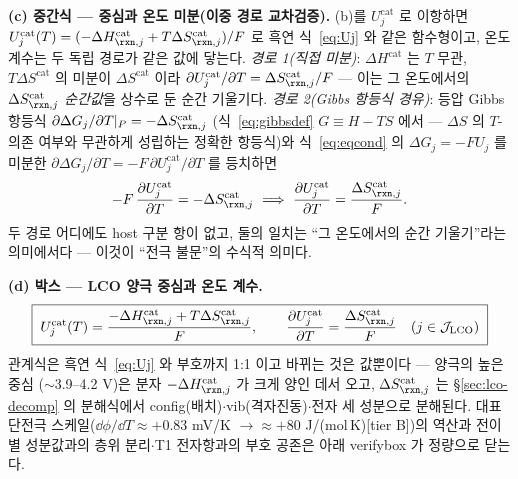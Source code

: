 \textbf{(c) 중간식 --- 중심과 온도 미분(이중 경로 교차검증).}
(b)를 $U_j^\mathrm{cat}$ 로 이항하면 $U_j^\mathrm{cat}(T)=(-\Delta H_{\rxn,j}^\mathrm{cat}
+T\Delta S_{\rxn,j}^\mathrm{cat})/F$ 로 흑연 식~\eqref{eq:Uj} 와 같은 함수형이고, 온도 계수는 두 독립
경로가 같은 값에 닿는다. \emph{경로 1(직접 미분)}: $\Delta H^\mathrm{cat}$ 는 $T$ 무관, $T\Delta S^\mathrm{cat}$
의 미분이 $\Delta S^\mathrm{cat}$ 이라 $\partial U_j^\mathrm{cat}/\partial T=\Delta S_{\rxn,j}^\mathrm{cat}/F$
--- 이는 그 온도에서의 $\Delta S_{\rxn,j}^\mathrm{cat}$ \emph{순간값}을 상수로 둔 순간 기울기다.
\emph{경로 2(Gibbs 항등식 경유)}: 등압 Gibbs 항등식 $\partial\Delta G_j/\partial T|_P=-\Delta S_{\rxn,j}^\mathrm{cat}$
(식~\eqref{eq:gibbsdef} $G\equiv H-TS$ 에서 --- $\Delta S$ 의 $T$-의존 여부와 무관하게 성립하는 정확한
항등식)와 식~\eqref{eq:eqcond} 의 $\Delta G_j=-FU_j$ 를 미분한
$\partial\Delta G_j/\partial T=-F\,\partial U_j^\mathrm{cat}/\partial T$ 를 등치하면
\[
-F\,\frac{\partial U_j^\mathrm{cat}}{\partial T}=-\Delta S_{\rxn,j}^\mathrm{cat}
\ \Longrightarrow\
\frac{\partial U_j^\mathrm{cat}}{\partial T}=\frac{\Delta S_{\rxn,j}^\mathrm{cat}}{F}.
\]
두 경로 어디에도 host 구분 항이 없고, 둘의 일치는 ``그 온도에서의 순간 기울기''라는 의미에서다 ---
이것이 ``전극 불문''의 수식적 의미다.

\textbf{(d) 박스 --- LCO 양극 중심과 온도 계수.}
\begin{equation}
\boxed{\;
U_j^\mathrm{cat}(T)=\frac{-\Delta H_{\rxn,j}^\mathrm{cat}+T\Delta S_{\rxn,j}^\mathrm{cat}}{F},
\qquad
\frac{\partial U_j^\mathrm{cat}}{\partial T}=\frac{\Delta S_{\rxn,j}^\mathrm{cat}}{F}
\quad(j\in\mathcal J_\mathrm{LCO})\;}
\label{eq:lco-dUdT}
\end{equation}
관계식은 흑연 식~\eqref{eq:Uj} 와 부호까지 1:1 이고 바뀌는 것은 값뿐이다 --- 양극의 높은 중심
($\sim$3.9--4.2 V)은 분자 $-\Delta H_{\rxn,j}^\mathrm{cat}$ 가 크게 양인 데서 오고, $\Delta S_{\rxn,j}^\mathrm{cat}$
는 \S\ref{sec:lco-decomp} 의 분해식에서 config(배치)$\cdot$vib(격자진동)$\cdot$전자 세 성분으로 분해된다.
대표 단전극 스케일($\dd\phi/\dd T\approx+0.83$ mV/K $\to\approx+80$ J/(mol\,K)[tier B])의 역산과
전이별 성분값과의 층위 분리$\cdot$T1 전자항과의 부호 공존은 아래 verifybox 가 정량으로 닫는다.

